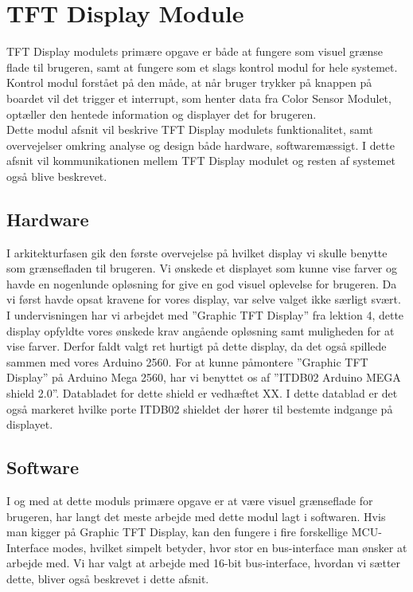 \graphicspath{{Chapters/Struktur/}}

\section{TFT Display Module}
TFT Display modulets primære opgave er både at fungere som visuel grænse flade til brugeren, samt at fungere som et slags kontrol modul for hele systemet. Kontrol modul forstået på den måde, at når bruger trykker på knappen på boardet vil det trigger et interrupt, som henter data fra Color Sensor Modulet, optæller den hentede information og displayer det for brugeren.\\ Dette modul afsnit vil beskrive TFT Display modulets funktionalitet, samt overvejelser omkring analyse og design både hardware, softwaremæssigt. I dette afsnit vil kommunikationen mellem TFT Display modulet og resten af systemet også blive beskrevet. 

\subsection{Hardware}
I arkitekturfasen gik den første overvejelse på hvilket display vi skulle benytte som grænsefladen til brugeren. Vi ønskede et displayet som kunne vise farver og havde en nogenlunde opløsning for give en god visuel oplevelse for brugeren. Da vi først havde opsat kravene for vores display, var selve valget ikke særligt svært. I undervisningen har vi arbejdet med ”Graphic TFT Display” fra lektion 4, dette display opfyldte vores ønskede krav angående opløsning samt muligheden for at vise farver. Derfor faldt valgt ret hurtigt på dette display, da det også spillede sammen med vores Arduino 2560. For at kunne påmontere ”Graphic TFT Display” på Arduino Mega 2560, har vi benyttet os af ”ITDB02 Arduino MEGA shield 2.0”. Databladet for dette shield er vedhæftet XX. I dette datablad er det også markeret hvilke porte ITDB02 shieldet der hører til bestemte indgange på displayet.

\subsection{Software}
I og med at dette moduls primære opgave er at være visuel grænseflade for brugeren, har langt det meste arbejde med dette modul lagt i softwaren. 
Hvis man kigger på Graphic TFT Display, kan den fungere i fire forskellige MCU-Interface modes, hvilket simpelt betyder, hvor stor en bus-interface man ønsker at arbejde med. Vi har valgt at arbejde med 16-bit bus-interface, hvordan vi sætter dette, bliver også beskrevet i dette afsnit. 

